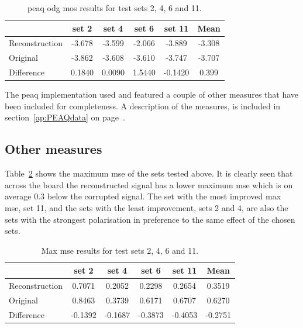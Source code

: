 \begin{table}\begin{center}
\caption{\gls{peaq} \gls{odg} \gls{mos} results for test sets 2, 4, 6 and 11.}
\label{tab:PEAQdataODG}
\begin{tabular}{|l|c|c|c|c|c|}\hline
                    & set 2     & set 4     & set 6     & set 11    & Mean      \\ \hline
  Reconstruction    & -3.678    & -3.599    & -2.066    & -3.889    & -3.308    \\
  Original          & -3.862    & -3.608    & -3.610    & -3.747    & -3.707    \\ \hline
  Difference        & 0.1840    & 0.0090    & 1.5440    & -0.1420   & 0.399     \\
  \hline
\end{tabular}\end{center}\end{table}

The \gls{peaq} implementation used \cite{Loizou2007} and featured a couple of other measures that have been included for completeness. A description of the measures, is included in section~\ref{ap:PEAQdata} on page~\pageref{ap:PEAQdata}.

\subsection{Other measures}
Table~\ref{tab:MaxMSE} shows the maximum \gls{mse} of the sets tested above. It is clearly seen that across the board the reconstructed signal has a lower maximum \gls{mse} which is on average 0.3 below the corrupted signal. The set with the most improved max \gls{mse}, set 11, and the sets with the least improvement, sets 2 and 4, are also the sets with the strongest polarisation in preference to the same effect of the chosen sets.

\begin{table}\begin{center}
\caption{Max \gls{mse} results for test sets 2, 4, 6 and 11.}
\label{tab:MaxMSE}
\begin{tabular}{|l|c|c|c|c|c|}\hline
                    & set 2     & set 4     & set 6     & set 11    & Mean      \\ \hline
  Reconstruction    & 0.7071    & 0.2052    & 0.2298    & 0.2654    & 0.3519    \\
  Original          & 0.8463    & 0.3739    & 0.6171    & 0.6707    & 0.6270    \\ \hline
  Difference        & -0.1392   & -0.1687   & -0.3873   & -0.4053   & -0.2751    \\
  \hline
\end{tabular}\end{center}\end{table}

